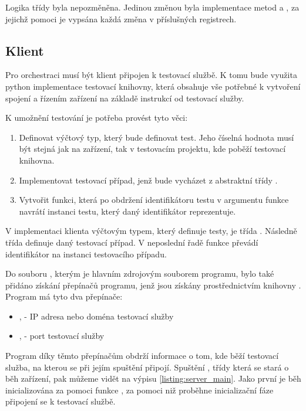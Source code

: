 Logika třídy  byla nepozměněna. Jedinou změnou byla implementace metod  a , za jejichž pomoci je vypsána každá změna v příslušných registrech. 

\subsection{Klient}

Pro orchestraci musí být klient připojen k testovací službě. K tomu bude využita python implementace testovací knihovny, která obsahuje vše potřebné k vytvoření spojení a řízením zařízení na základě instrukcí od testovací služby. 

K umožnění testování je potřeba provést tyto věci:

\begin{enumerate}
    \item Definovat výčtový typ, který bude definovat test. Jeho číselná hodnota musí být stejná jak na zařízení, tak v testovacím projektu, kde poběží testovací knihovna.
    \item Implementovat testovací případ, jenž bude vycházet z abstraktní třídy .
    \item Vytvořit funkci, která po obdržení identifikátoru testu v argumentu funkce navrátí instanci testu, který daný identifikátor reprezentuje.
\end{enumerate}


V implementaci klienta výčtovým typem, který definuje testy, je třída . Následně třída  definuje daný testovací případ. V neposlední řadě funkce  převádí identifikátor na instanci testovacího případu. 

Do souboru , kterým je hlavním zdrojovým souborem programu, bylo také přidáno získání přepínačů programu, jenž jsou získány prostřednictvím knihovny . Program má tyto dva přepínače:

\begin{itemize}
    \item {},  - IP adresa nebo doména testovací služby
    \item {},  - port testovací služby
\end{itemize}

Program díky těmto přepínačům obdrží informace o tom, kde běží testovací služba, na kterou se při jejím spuštění připojí. Spuštění , třídy která se stará o běh zařízení, pak můžeme vidět na výpisu \ref{listing:server_main}. Jako první je běh inicializována za pomoci funkce , za pomoci niž proběhne inicializační fáze připojení se k testovací službě. 

